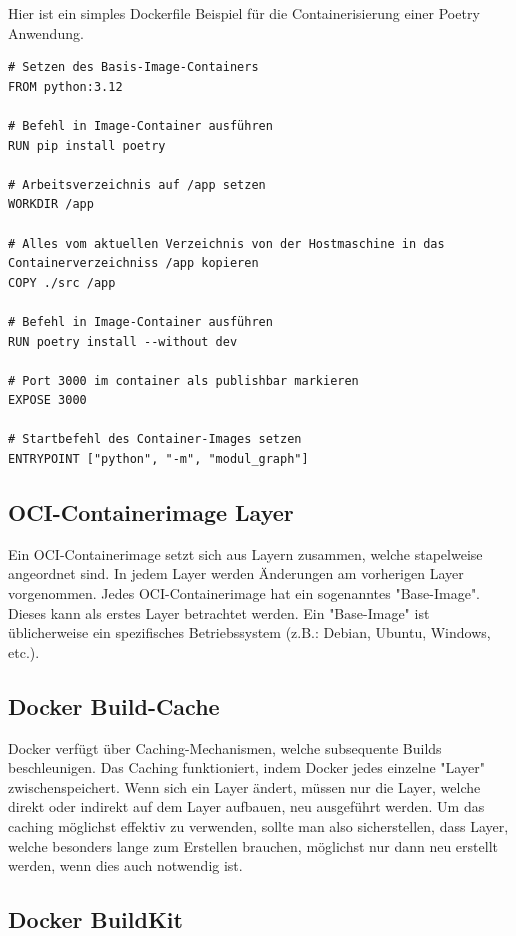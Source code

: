 \documentclass[
	12pt,
	a4paper,
	printlength,
	bibliography=totoc,
	chapterprefix,
	headings=openright,
	numbers=endperiod,
	parskip=half,
	twoside
 ]{scrreprt}
\begin{document}
Hier ist ein simples Dockerfile Beispiel für die Containerisierung einer Poetry Anwendung. 


\begin{verbatim}
# Setzen des Basis-Image-Containers
FROM python:3.12

# Befehl in Image-Container ausführen
RUN pip install poetry

# Arbeitsverzeichnis auf /app setzen
WORKDIR /app

# Alles vom aktuellen Verzeichnis von der Hostmaschine in das Containerverzeichniss /app kopieren 
COPY ./src /app

# Befehl in Image-Container ausführen
RUN poetry install --without dev

# Port 3000 im container als publishbar markieren
EXPOSE 3000

# Startbefehl des Container-Images setzen
ENTRYPOINT ["python", "-m", "modul_graph"]
\end{verbatim}


\subsection{OCI-Containerimage Layer}


Ein OCI-Containerimage setzt sich aus Layern zusammen, welche stapelweise angeordnet sind. In jedem Layer werden Änderungen am vorherigen Layer vorgenommen. Jedes OCI-Containerimage hat ein sogenanntes "Base-Image". Dieses kann als erstes Layer betrachtet werden. Ein "Base-Image" ist üblicherweise ein spezifisches Betriebssystem (z.B.: Debian, Ubuntu, Windows, etc.). 

\subsection{Docker Build-Cache}

Docker verfügt über Caching-Mechanismen, welche subsequente Builds beschleunigen. Das Caching funktioniert, indem Docker jedes einzelne "Layer" zwischenspeichert. Wenn sich ein Layer ändert, müssen nur die Layer, welche direkt oder indirekt auf dem Layer aufbauen, neu ausgeführt werden. Um das caching möglichst effektiv zu verwenden, sollte man also sicherstellen, dass Layer, welche besonders lange zum Erstellen brauchen, möglichst nur dann neu erstellt werden, wenn dies auch notwendig ist. 



\subsection{Docker BuildKit}
\end{document}

